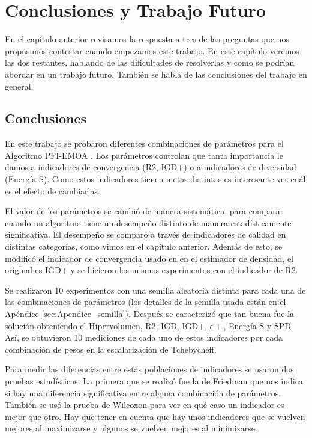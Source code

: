 \chapter{Conclusiones y Trabajo Futuro}

En el capítulo anterior revisamos la respuesta a tres de las preguntas que nos propusimos contestar cuando empezamos este trabajo. En este capítulo veremos las dos restantes, hablando de las dificultades de resolverlas y como se podrían abordar en un trabajo futuro. También se habla de las conclusiones del trabajo en general.


\section{Conclusiones}


En este trabajo se probaron diferentes combinaciones de parámetros para el Algoritmo PFI-EMOA \cite{PFI}. Los parámetros controlan que tanta importancia le damos a indicadores de convergencia (R2, IGD+) o a indicadores de diversidad (Energía-S). Como estos indicadores tienen metas distintas es interesante ver cuál es el efecto de cambiarlas.

El valor de los parámetros se cambió de manera sistemática, para comparar cuando un algoritmo tiene un desempeño distinto de manera estadísticamente significativa. El desempeño se comparó a través de indicadores de calidad en distintas categorías, como vimos en el capítulo anterior. Además de esto, se modificó el indicador de convergencia usado en \cite{PFI} en el estimador de densidad, el original es IGD+ y se hicieron los mismos experimentos con el indicador de R2. 

Se realizaron 10 experimentos con una semilla aleatoria distinta para cada una de las combinaciones de parámetros (los detalles de la semilla usada están en el Apéndice \ref{sec:Apendice_semilla}). Después se caracterizó que tan buena fue la solución obteniendo el Hipervolumen, R2, IGD, IGD+, $\epsilon +$, Energía-S y SPD. Así, se obtuvieron 10 mediciones de cada uno de estos indicadores por cada combinación de pesos en la escalarización de Tchebycheff. 

Para medir las diferencias entre estas poblaciones de indicadores se usaron dos pruebas estadísticas. La primera que se realizó fue la de Friedman que nos indica si hay una diferencia significativa entre alguna combinación de parámetros. También se usó la prueba de Wilcoxon para ver en qué caso un indicador es mejor que otro. Hay que tener en cuenta que hay unos indicadores que se vuelven mejores al maximizarse y algunos se vuelven mejores al minimizarse.  

